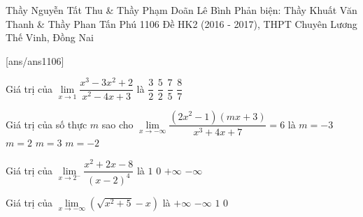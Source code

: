 \begin{name}
{Thầy Nguyễn Tất Thu \& Thầy Phạm Doãn Lê Bình \newline Phản biện: Thầy Khuất Văn Thanh \& Thầy Phan Tấn Phú}
{1106 Đề HK2 (2016 - 2017), THPT Chuyên Lương Thế Vinh, Đồng Nai}
\end{name}
\setcounter{ex}{0}\setcounter{bt}{0}
[ans/ans1106]
\begin{ex}%
Giá trị của $\lim\limits_{x \to 1} \dfrac{x^3 - 3x^2 + 2}{x^2 - 4x + 3}$ là
	\choice
	{\True $\dfrac{3}{2}$}
	{$\dfrac{5}{2}$}
	{$\dfrac{7}{5}$}
	{$\dfrac{8}{7}$}
	\end{ex}

\begin{ex}%
	Giá trị của số thực $m$ sao cho $\lim\limits_{x \to  - \infty } \dfrac{(2x^2 - 1)(mx + 3)}{x^3 + 4x + 7} = 6$ là
	\choice
	{$m = -3$}
	{$m = 2$}
	{\True $m = 3$}
	{$m = -2$}
	\end{ex}
	
\begin{ex}%
	Giá trị của $\lim\limits_{x \to 2^- } \dfrac{x^2 + 2x - 8}{(x - 2)^4}$ là
	\choice
	{$1$}
	{$0$}
	{$+\infty $}
	{\True $-\infty $}
	\end{ex}
	
\begin{ex}%
	Giá trị của $\lim \limits_{x \to  - \infty } \left( \sqrt {x^2 + 5}  - x \right)$ là
	\choice
	{\True $+\infty $}
	{$-\infty $}
	{$1$}
	{$0$}
	\end{ex}

